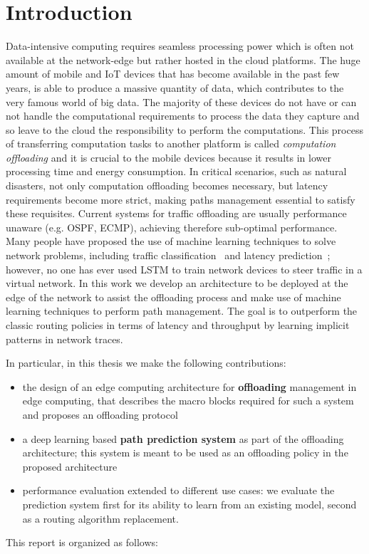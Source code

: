 \chapter{Introduction}

Data-intensive computing requires seamless processing power which is often not available at the network-edge but rather hosted in the cloud platforms. The huge amount of mobile and IoT devices that has become available in the past few years, is able to produce a massive quantity of data, which contributes to the very famous world of big data. The majority of these devices do not have or can not handle the computational requirements to process the data they capture and so leave to the cloud the responsibility to perform the computations. This process of transferring computation tasks to another platform is called {\it computation offloading} and it is crucial to the mobile devices because it results in lower processing time and energy consumption. In critical scenarios, such as natural disasters, not only computation offloading becomes necessary, but latency requirements become more strict, making paths management essential to satisfy these requisites. Current systems for traffic offloading are usually performance unaware (e.g. OSPF, ECMP), achieving therefore sub-optimal performance. Many people have proposed the use of machine learning techniques to solve network problems, including traffic classification~\cite{nguyen2008survey} and latency prediction~\cite{end-to-end}; however, no one has ever used LSTM to train network devices to steer traffic in a virtual network. In this work we develop an architecture to be deployed at the edge of the network to assist the offloading process and make use of machine learning techniques to perform path management. The goal is to outperform the classic routing policies in terms of latency and throughput by learning implicit patterns in network traces.

In particular, in this thesis we make the following contributions:
\begin{itemize}
\item the design of an edge computing architecture for \textbf{offloading} management in edge computing, that describes the macro blocks required for such a system and proposes an offloading protocol
\item a deep learning based \textbf{path prediction system} as part of the offloading architecture; this system is meant to be used as an offloading policy in the proposed architecture 
\item performance evaluation extended to different use cases: we evaluate the prediction system first for its ability to learn from an existing model, second as a routing algorithm replacement.
\end{itemize}
This report is organized as follows:
